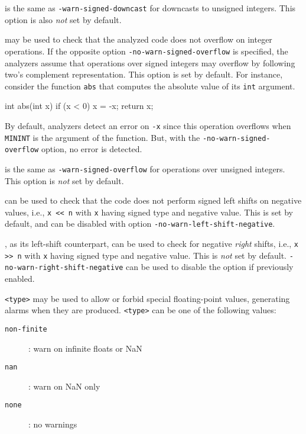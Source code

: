 \begin{description}
\item {} is the same as
  \texttt{-warn-signed-downcast} for downcasts to unsigned integers. This option
  is also \emph{not} set by default.

\item {} may be used to check that the
  analyzed code does not overflow on integer operations. If the opposite option
  \texttt{-no-warn-signed-overflow} is specified, the analyzers assume that
  operations over signed integers may overflow by following two's complement
  representation. This option is set by default. For instance, consider the
  function \lstinline|abs| that computes the absolute value of its
  \lstinline|int| argument.
\begin{ccode}
int abs(int x) {
  if (x < 0) x = -x;
  return x;
}
\end{ccode}
By default, analyzers detect an error on
\lstinline|-x| since this operation overflows when \lstinline|MININT| is the
argument of the function. But, with the \texttt{-no-warn-signed-overflow}
option, no error is detected.

\item {} is the same as
  \texttt{-warn-signed-overflow} for operations over unsigned integers. This
  option is \emph{not} set by default.

\item {} can be used to check that the
  code does not perform signed left shifts on negative values, i.e.,
  \lstinline|x << n| with \lstinline|x| having signed type and negative
  value. This is set by default, and can be disabled with option
  \texttt{-no-warn-left-shift-negative}.

\item {}, as its left-shift counterpart,
  can be used to check for negative {\em right} shifts, i.e.,
  \lstinline|x >> n| with \lstinline|x| having signed type and negative value.
  This is {\em not} set by default.
  \texttt{-no-warn-right-shift-negative} can be used to disable the option if
  previously enabled.

\item {} \texttt{<type>} may be used to allow
  or forbid special floating-point values, generating alarms when they are
  produced. \texttt{<type>} can be one of the following values:
  \begin{description}
  \item[\texttt{non-finite}]: warn on infinite floats or NaN
  \item[\texttt{nan}]: warn on NaN only
  \item[\texttt{none}]: no warnings
  \end{description}


\end{description}
